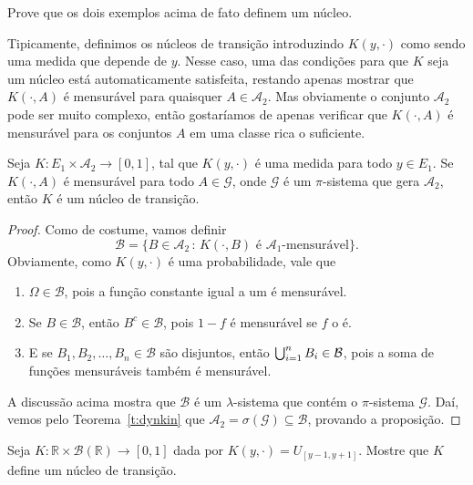 \begin{exercise}
  Prove que os dois exemplos acima de fato definem um núcleo.
\end{exercise}

Tipicamente, definimos os núcleos de transição introduzindo $K(y, \cdot)$ como sendo uma medida que depende de $y$.
Nesse caso, uma das condições para que $K$ seja um núcleo está automaticamente satisfeita, restando apenas mostrar que $K(\cdot, A)$ é mensurável para quaisquer $A \in \mathcal{A}_2$.
Mas obviamente o conjunto $\mathcal{A}_2$ pode ser muito complexo, então gostaríamos de apenas verificar que $K(\cdot, A)$ é mensurável para os conjuntos $A$ em uma classe rica o suficiente.

\begin{proposition}
  \label{p:K_nucleo_na_classe}
  Seja $K:E_1 \times \mathcal{A}_2 \to [0,1]$, tal que $K(y, \cdot)$ é uma medida para todo $y \in E_1$.
  Se $K(\cdot, A)$ é mensurável para todo $A \in \mathcal{G}$, onde $\mathcal{G}$ é um $\pi$-sistema que gera $\mathcal{A}_2$, então $K$ é um núcleo de transição.
\end{proposition}

\begin{proof}
  Como de costume, vamos definir
  \begin{equation}
    \mathcal{B} = \{B \in \mathcal{A}_2\, : \, K(\cdot, B) \text{ é $\mathcal{A}_1$-mensurável}\}.
  \end{equation}
  Obviamente, como $K(y, \cdot)$ é uma probabilidade, vale que
  \begin{enumerate}[\quad a)]
  \item $\Omega \in \mathcal{B}$, pois a função constante igual a um é mensurável.
  \item Se $B \in \mathcal{B}$, então $B^c \in \mathcal{B}$, pois $1 - f$ é mensurável se $f$ o é.
  \item E se $B_1, B_2,\dots, B_n \in \mathcal{B}$ são disjuntos, então $\operatorname*{{\textstyle \bigcup}}_{i=1}^n B_i \in \mathcal{B}$, pois a soma de funções mensuráveis também é mensurável.
  \end{enumerate}

  A discussão acima mostra que $\mathcal{B}$ é um $\lambda$-sistema que contém o $\pi$-sistema $\mathcal{G}$.
  Daí, vemos pelo Teorema~\ref{t:dynkin} que $\mathcal{A}_2 = \sigma(\mathcal{G}) \subseteq \mathcal{B}$, provando a proposição.
\end{proof}

\begin{exercise}
  Seja $K:\mathbb{R} \times \mathcal{B}(\mathbb{R}) \to [0,1]$ dada por $K(y, \cdot) = U_{[y - 1,y + 1]}$.
  Mostre que $K$ define um núcleo de transição.
\end{exercise}

